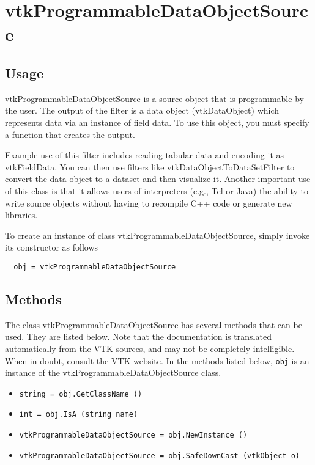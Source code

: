 \section{vtkProgrammableDataObjectSource}

\subsection{Usage}

 vtkProgrammableDataObjectSource is a source object that is programmable by
 the user. The output of the filter is a data object (vtkDataObject) which
 represents data via an instance of field data. To use this object, you
 must specify a function that creates the output.  

 Example use of this filter includes reading tabular data and encoding it
 as vtkFieldData. You can then use filters like vtkDataObjectToDataSetFilter
 to convert the data object to a dataset and then visualize it.  Another
 important use of this class is that it allows users of interpreters (e.g.,
 Tcl or Java) the ability to write source objects without having to
 recompile C++ code or generate new libraries.
 

To create an instance of class vtkProgrammableDataObjectSource, simply
invoke its constructor as follows
\begin{verbatim}
  obj = vtkProgrammableDataObjectSource
\end{verbatim}
\subsection{Methods}

The class vtkProgrammableDataObjectSource has several methods that can be used.
  They are listed below.
Note that the documentation is translated automatically from the VTK sources,
and may not be completely intelligible.  When in doubt, consult the VTK website.
In the methods listed below, \verb|obj| is an instance of the vtkProgrammableDataObjectSource class.
\begin{itemize}
\item  \verb|string = obj.GetClassName ()|

\item  \verb|int = obj.IsA (string name)|

\item  \verb|vtkProgrammableDataObjectSource = obj.NewInstance ()|

\item  \verb|vtkProgrammableDataObjectSource = obj.SafeDownCast (vtkObject o)|

\end{itemize}
